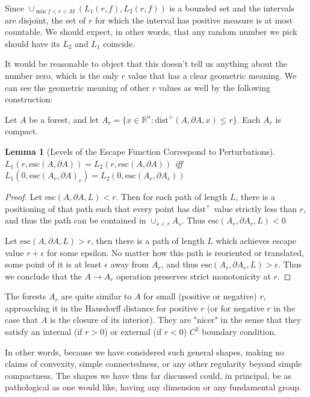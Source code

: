 \documentclass[10pt,a4paper]{article}
\newtheorem{lem}[thm]{Lemma}          %
\theoremstyle{definition}
\def\R{\mathbb{R}}
\begin{document}
Since $\cup_{\min f<r<M}  (L_1(r,f),L_2(r,f)) $ is a bounded set and the intervals are disjoint, the set of $r$ for which the interval has positive measure is at most countable. We should expect, in other words, that any random number we pick should have its $L_2$ and $L_1$ coincide.

It would be reasonable to object that this doesn't tell us anything about the number zero, which is the only $r$ value that has a clear geometric meaning. We can see the geometric meaning of other $r$ values as well by the following construction:

Let $A$ be a forest, and let $A_r = \{x\in\R^n: \mathrm{dist}^+(A,\partial A, x) \leq r\}$. Each $A_r$ is compact. 
\begin{lem}[Levels of the Escape Function Correspond to Perturbations]
$L_1(r,\mathrm{esc}(A,\partial A)) = L_2(r,\mathrm{esc}(A,\partial A))$ iff $L_1(0,\mathrm{esc}(A_r,\partial A)_r) = L_2(0,\mathrm{esc}(A_r,\partial A_r))$
\end{lem}
\label{lem:levels}

\begin{proof}
Let $\mathrm{esc}(A,\partial A, L) < r$. Then for each path of length $L$, there is a positioning of that path such that every point has $\mathrm{dist}^+$ value strictly less than $r$, and thus the path can be contained in $\cup_{s<r}A_s$. Thus $\mathrm{esc}(A_r,\partial A_r, L) < 0$

Let $\mathrm{esc}(A,\partial A, L) > r$, then there is a path of length $L$ which achieves escape value $r+\epsilon$ for some epsilon. No matter how this path is reoriented or translated, some point of it is at least $\epsilon$ away from $A_r$, and thus $\mathrm{esc}(A_r,\partial A_r, L) > \epsilon$. Thus we conclude that the $A\rightarrow A_r$ operation preserves strict monotonicity at $r$. 
\end{proof}

The forests $A_r$ are quite similar to $A$ for small (positive or negative) $r$, approaching it in the Hausdorff distance for positive $r$ (or for negative $r$ in the case that $A$ is the closure of its interior). They are "nicer" in the sense that they satisfy an internal (if $r>0$) or external (if $r<0$) $C^2$ boundary condition.

In other words, because we have considered such general shapes, making no claims of convexity, simple connectedness, or any other regularity beyond simple compactness. The shapes we have thus far discussed could, in principal, be as pathological as one would like, having any dimension or any fundamental group. 
\end{document}
